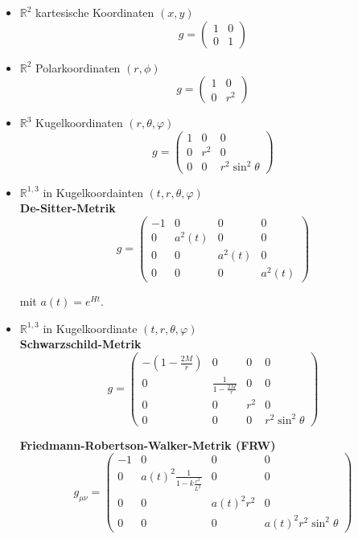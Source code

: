 \documentclass{article}
\newcommand{\lr}[1]{\left(#1\right)}
\begin{document}
	\begin{itemize}
		\item $\mathbb{R}^2$ kartesische Koordinaten $(x,y)$
			$$g =
			\begin{pmatrix}
				1 & 0 \\
				0 & 1
			\end{pmatrix}$$
		
		\item $\mathbb{R}^2$ Polarkoordinaten $(r,\phi)$
			$$g =
			\begin{pmatrix}
				1 & 0 \\
				0 & r^2
			\end{pmatrix}$$
		
		\item $\mathbb{R}^3$ Kugelkoordinaten $(r,\theta,\varphi)$
			$$g =
			\begin{pmatrix}
			1 & 0 & 0 \\
			0 & r^2 & 0 \\
			0 & 0 & r^2\sin^2\theta
			\end{pmatrix}
			$$
		
		\item $\mathbb{R}^{1,3}$ in Kugelkoordainten $(t,r,\theta,\varphi)$\\
		\textbf{De-Sitter-Metrik}
			$$g = 
			\begin{pmatrix}
				-1 & 0 & 0 & 0 \\
				0 & a^2(t) & 0 & 0 \\
				0 & 0 & a^2(t) & 0 \\
				0 & 0 & 0 & a^2(t)
			\end{pmatrix}
			$$
		
		mit $a(t) = e^{H t}$.
		
		\item $\mathbb{R}^{1,3}$ in Kugelkoordinate $(t,r,\theta,\varphi)$\\
		\textbf{Schwarzschild-Metrik}
			$$g = 
			\begin{pmatrix}
				-\lr{ 1 - \frac{2M}{r} } & 0 & 0 & 0 \\
				0 & \frac{1}{1 - \frac{2M}{r}} & 0 & 0 \\
				0 & 0 & r^2 & 0 \\
				0 & 0 & 0 & r^2\sin^2\theta
			\end{pmatrix}
			$$
		
		\textbf{Friedmann-Robertson-Walker-Metrik (FRW)}
			$$
			g_{\mu\nu} = 
			\begin{pmatrix}
				-1 & 0 & 0 & 0 \\
				0 & a(t)^2 \frac{1}{1 - k \frac{r^2}{L^2}} & 0 & 0 \\
				0 & 0 & a(t)^2r^2 & 0 \\
				0 & 0 & 0 & a(t)^2 r^2\sin^2\theta
			\end{pmatrix}
			$$
	\end{itemize}
\end{document}
